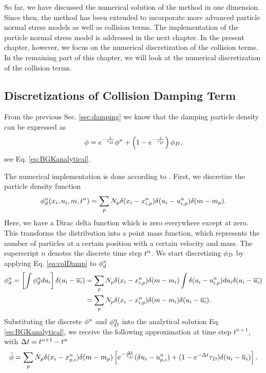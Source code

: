 So far, we have discussed the numerical solution of the \MP method in one dimension. Since then, the method has been extended to incorporate more advanced particle normal stress models as well as collision terms.
The implementation of the particle normal stress model is addressed in the next chapter. In the present chapter, however, we focus on the numerical discretization of the collision terms.
In the remaining part of this chapter, we will look at the numerical discretization of the collision terms.



\subsection{Discretizations of Collision Damping Term}
\label{sec:DiscCollDamp}
From the previous Sec. \ref{sec:damping} we know that the damping particle density can be expressed as
\begin{equation}
    \phi = e^{-\frac{t}{\tau_D}} \phi^n + \left(1-e^{- \frac{t}{\tau_D}} \right) \phi_{D},
\end{equation}
see Eq. \eqref{eq:BGKanalytical}.

The numerical implementation is done according to \cite{damp}.
First, we discretize the particle density function 
\begin{equation}
    \phi_d^n (x_i, u_i, m, t^n) = \sum_{p} N_p \delta (x_i - x_{i,p}^n) \delta(u_i - u_{i,p}^n) \delta (m - m_p).
\end{equation}
Here, we have a Dirac delta function which is zero everywhere except at zero. This transforms the distribution into a point mass function, which represents the number of particles at a certain position with a certain velocity and mass. 
The superscript $n$ denotes the discrete time step $t^n$.
We start discretizing $\phi_D$ by applying Eq. \eqref{eq:colDamp} to $\phi_d^n$
\begin{align}
    \phi_d^n = \left[ \int \phi_d^n d u_i\right] \delta (u_i - \overline{u_i}) &= \sum_p N_p \delta (x_{i} - x_{i,p}^n) \delta (m - m_i) \int \delta (u_i - u_{i,p}^n) d u_i \delta (u_i - \overline{u_i}) \\ &= \sum_p N_p \delta (x_i - x_{i,p}^n) \delta (m - m_i) \delta (u_i - \overline{u_i}).
\end{align}
Substituting the discrete $\phi^n$ and $\phi^n_D$ into the analytical solution Eq. \eqref{eq:BGKanalytical}, we receive the following approximation at time step $t^{n+1}$, with $\Delta t = t^{n+1} - t^{n}$
\begin{equation}
    \Tilde{\phi} = \sum_{p} N_p \delta (x_i - x_{p,i}^n) \delta (m - m_p ) \left[ e^{- \frac{\Delta t}{\tau_D}} (\delta u_i - u_{p,i}^n ) + (1- e^{- \Delta t}{\tau_D}) \delta (u_i - \overline{u}_i) \right].
\end{equation}

